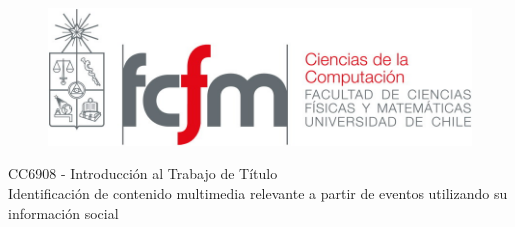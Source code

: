 \documentclass[11pt,letterpaper]{article}
\title{}
\title{}
\author{}
\date{}
\begin{document}
\begin{titlepage}
\begin{figure}[t]
\includegraphics[scale=0.35]{./img/FCFM.jpg}

\end{figure}

\vspace*{0.2 in}

\begin{center}
\Large CC6908 - Introducción al Trabajo de Título \\

\LARGE Identificación de contenido multimedia relevante a partir de eventos utilizando su información social


\end{center}
\end{titlepage}
\end{document}

